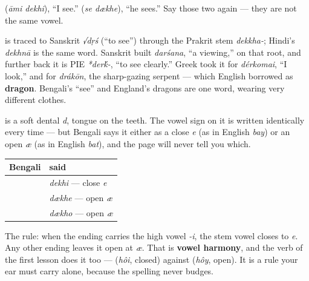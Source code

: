   (\emph{āmi dekhi}), \textquotedblleft{}I see.\textquotedblright{}   (\emph{se dækhe}), \textquotedblleft{}he sees.\textquotedblright{} Say those two again — they are not the same vowel.

\begin{cousinweb}
\textbf{} is traced to Sanskrit \emph{√dṛś} (\textquotedblleft{}to see\textquotedblright{}) through the Prakrit stem \emph{dekkha-}; Hindi's \emph{dekhnā} is the same word. Sanskrit built \emph{darśana}, \textquotedblleft{}a viewing,\textquotedblright{} on that root, and further back it is PIE \emph{*der\'{k}-}, \textquotedblleft{}to see clearly.\textquotedblright{} Greek took it for \emph{dérkomai}, \textquotedblleft{}I look,\textquotedblright{} and for \emph{drákōn}, the sharp-gazing serpent — which English borrowed as \textbf{dragon}. Bengali's \textquotedblleft{}see\textquotedblright{} and England's dragons are one word, wearing very different clothes.
\end{cousinweb}

\begin{sounds}
\textbf{} is a soft dental \emph{d}, tongue on the teeth. The vowel sign \textbf{} on it is written identically every time — but Bengali says it either as a close \emph{e} (as in English \emph{bay}) or an open \emph{æ} (as in English \emph{bat}), and the page will never tell you which.
\end{sounds}

\begin{grammarlens}[title={Grammar Lens: the ending decides the vowel}]
\noindent
\begin{tabularx}{\linewidth}{@{}>{\raggedright\arraybackslash}X>{\raggedright\arraybackslash}X@{}}
\toprule
\textbf{Bengali} & \textbf{said} \\
\midrule
\bn{আমি} \bn{দেখি} & \emph{dekhi} — close \emph{e} \\
\bn{সে} \bn{দেখে} & \emph{dækhe} — open \emph{æ} \\
\bn{তুমি} \bn{দেখো} & \emph{dækho} — open \emph{æ} \\
\bottomrule
\end{tabularx}

The rule: when the ending carries the high vowel \emph{-i}, the stem vowel closes to \emph{e}. Any other ending leaves it open at \emph{æ}. That is \textbf{vowel harmony}, and the verb of the first lesson does it too —   (\emph{hôi}, closed) against   (\emph{hôy}, open). It is a rule your ear must carry alone, because the spelling never budges.
\end{grammarlens}

